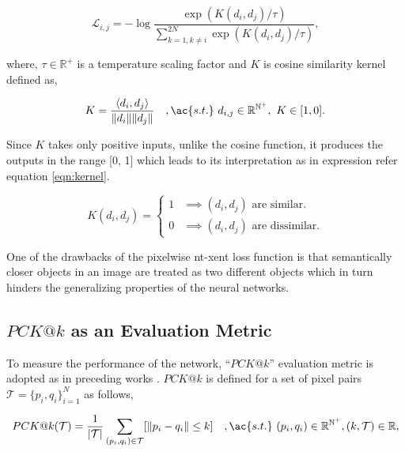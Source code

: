 \begin{equation}
    \mathcal{L}_{i, j} = -\log \dfrac{\exp(K(d_i, d_j) / \tau)}{\sum^{2N}_{k=1, k \neq i} \exp(K(d_i, d_j) / \tau)},
\end{equation}

where, $\tau \in \mathbb{R}^+$ is a temperature scaling factor and $K$ is cosine similarity kernel defined as,

\begin{equation}
    \label{eqn:cosine_similarity}
    K = \dfrac{\left< d_i, d_j \right>}{\| d_i\| \| d_j\|} \quad ,\ac{s.t.} \ d_{i, j} \in \mathbb{R}^{\mathbb{N}^+}, \ K \in  [1, 0].
\end{equation}

Since $K$ takes only positive inputs, unlike the cosine function, it produces the outputs in the range [0, 1] which leads to its interpretation as in expression refer equation \ref{eqn:kernel}.

\begin{equation}
    \label{eqn:kernel}
    K(d_i, d_j) = \begin{cases}
        1 & \implies (d_i, d_j) \text{ are similar}.    \\
        0 & \implies (d_i, d_j) \text{ are dissimilar}.
    \end{cases}
\end{equation}

One of the drawbacks of the pixelwise nt-xent loss function is that semantically closer objects in an image are treated as two different objects which in turn
hinders the generalizing properties of the neural networks.

\subsection{$PCK@k$ as an Evaluation Metric}

To measure the performance of the network, ``$PCK@k$'' evaluation metric is adopted as in preceding works \parencites{pck}{adrian2022efficient}. $PCK@k$ is defined
for a set of pixel pairs $\mathcal{T} = \{p_i, q_i \}^N_{i=1}$ as follows,

\begin{equation}
    \label{eqn:pck}
    PCK@k(\mathcal{T}) = \dfrac{1}{|\mathcal{T}|} \displaystyle\sum_{(p_i, q_i) \in \mathcal{T}} [ \|p_i - q_i\| \leq k] \quad ,\ac{s.t.} \ (p_i, q_i) \in \mathbb{R}^{\mathbb{N}^+}, (k, \mathcal{T}) \in \mathbb{R},
\end{equation}

